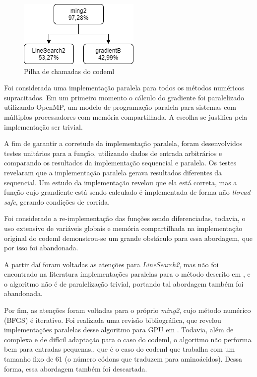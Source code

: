 \documentclass[cic,tc]{iiufrgs}
\begin{document}
\begin{figure}
  \caption{Pilha de chamadas do codeml}
    \begin{center}
        \includegraphics[width=0.3\linewidth]{img/kcachegrind.png}
    \end{center}
    \label{fig:kcachegrind}
\end{figure}

Foi considerada uma implementação paralela para todos os métodos numéricos
supracitados. Em um primeiro momento o cálculo do gradiente foi paralelizado
utilizando OpenMP, um modelo de programação paralela para sistemas com
múltiplos processadores com memória compartilhada.\cite{chandra2001parallel} A
escolha se justifica pela implementação ser trivial.

A fim de garantir a corretude da implementação paralela, foram desenvolvidos
testes unitários para a função, utilizando dados de entrada arbitrários e
comparando os resultados da implementação sequencial e paralela. Os testes
revelaram que a implementação paralela gerava resultados diferentes da
sequencial. Um estudo da implementação revelou que ela está correta, mas a
função cujo grandiente está sendo calculado é implementada de forma não
\textit{thread-safe}, gerando condições de corrida.

Foi considerado a re-implementação das funções sendo diferenciadas, todavia, o
uso extensivo de variáveis globais e memória compartilhada na implementação
original do codeml demonstrou-se um grande obstáculo para essa abordagem, que
por isso foi abandonada.

A partir daí foram voltadas as atenções para \textit{LineSearch2}, mas não foi
encontrado na literatura implementações paralelas para o método descrito em
\cite{wolfe1978numerical}, e o algoritmo não é de paralelização trivial,
portando tal abordagem também foi abandonada.

Por fim, as atenções foram voltadas para o próprio \textit{ming2}, cujo método
numérico (BFGS) é iterativo. Foi realizada uma revisão bibliográfica, que
revelou implementações paralelas desse algoritmo para GPU em
\cite{fei2014parallel}. Todavia, além de complexa e de difícil adaptação para o
caso do codeml, o algoritmo não performa bem para entradas
pequenas,\cite{fei2014parallel}. que é o caso do codeml que trabalha com um
tamanho fixo de 61 (o número códons que traduzem para aminoácidos). Dessa
forma, essa abordagem também foi descartada.
\end{document}
